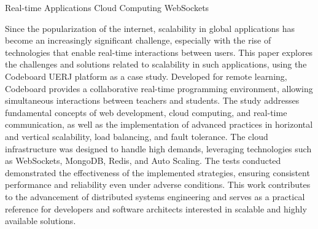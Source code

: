 {Real-time Applications}
{Cloud Computing}
{WebSockets}



Since the popularization of the internet, scalability in global applications has become an increasingly significant challenge, especially with the rise of technologies that enable real-time interactions between users. This paper explores the challenges and solutions related to scalability in such applications, using the Codeboard UERJ platform as a case study. Developed for remote learning, Codeboard provides a collaborative real-time programming environment, allowing simultaneous interactions between teachers and students. The study addresses fundamental concepts of web development, cloud computing, and real-time communication, as well as the implementation of advanced practices in horizontal and vertical scalability, load balancing, and fault tolerance. The cloud infrastructure was designed to handle high demands, leveraging technologies such as WebSockets, MongoDB, Redis, and Auto Scaling. The tests conducted demonstrated the effectiveness of the implemented strategies, ensuring consistent performance and reliability even under adverse conditions. This work contributes to the advancement of distributed systems engineering and serves as a practical reference for developers and software architects interested in scalable and highly available solutions.

\printkeys %

